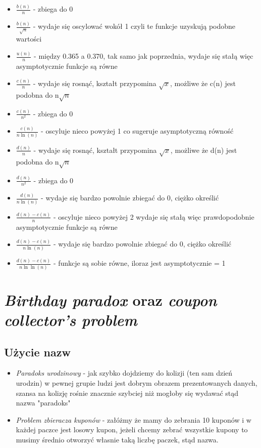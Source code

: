 \documentclass{article}
\begin{document}
\begin{itemize}
    \item \textbf{} \(\frac{b(n)}{n}\)
    - zbiega do 0
    \item \textbf{} \(\frac{b(n)}{\sqrt{n}}\)
    - wydaje się oscylować wokół 1 czyli te funkcje uzyskują podobne wartości
    \item \textbf{} \(\frac{u(n)}{n}\)
    - między 0.365 a 0.370, tak samo jak poprzednia, wydaje się stałą więc asymptotycznie funkcje są równe
    \item \textbf{} \(\frac{c(n)}{n}\)
    - wydaje się rosnąć, kształt przypomina \(\sqrt{x}\), możliwe że c(n) jest podobna do n\(\sqrt{n}\)
    \item \textbf{} \(\frac{c(n)}{n^2}\)
    - zbiega do 0
    \item \textbf{} \(\frac{c(n)}{n \ln{(n)}}\)
    - oscyluje nieco powyżej 1 co sugeruje asymptotyczną równość
    \item \textbf{} \(\frac{d(n)}{n}\)
    - wydaje się rosnąć, kształt przypomina \(\sqrt{x}\), możliwe że d(n) jest podobna do n\(\sqrt{n}\)
    \item \textbf{} \(\frac{d(n)}{n^2}\)
    - zbiega do 0
    \item \textbf{} \(\frac{d(n)}{n \ln{(n)}}\)
    - wydaje się bardzo powolnie zbiegać do 0, ciężko określić
    \item \textbf{} \(\frac{d(n) - c(n)}{n}\)
    - oscyluje nieco powyżej 2 wydaje się stałą więc prawdopodobnie asymptotycznie funkcje są równe
    \item \textbf{} \(\frac{d(n) - c(n)}{n \ln{(n)}}\)
    - wydaje się bardzo powolnie zbiegać do 0, ciężko określić
    \item \textbf{} \(\frac{d(n) - c(n)}{n \ln{\ln{(n)}}}\)
    - funkcje są sobie równe, iloraz jest asymptotycznie = 1
\end{itemize}

\section*{\textsl{Birthday paradox} oraz \textsl{coupon collector's problem}}
\subsection{Użycie nazw}
\begin{itemize}
    \item \textsl{Paradoks urodzinowy} - jak szybko dojdziemy do kolizji (ten sam dzień urodzin) w pewnej grupie ludzi jest dobrym obrazem prezentowanych danych,
    szansa na kolizję rośnie znacznie szybciej niż mogłoby się wydawać stąd nazwa "paradoks"
    \item \textsl{Problem zbieracza kuponów} - załóżmy że mamy do zebrania 10 kuponów i w każdej paczce jest losowy kupon, jeżeli chcemy zebrać wszystkie kupony to musimy
    średnio otworzyć własnie taką liczbę paczek, stąd nazwa.
\end{itemize}
\end{document}
